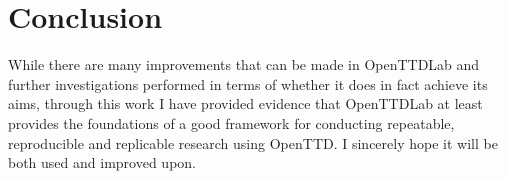 \documentclass[logo,msc,dsti]{style/infthesis}    %
\begin{document}
{\chapter{Conclusion}
\label{chapter:conclusion}

While there are many improvements that can be made in OpenTTDLab and further investigations performed in terms of whether it does in fact achieve its aims, through this work I have provided evidence that OpenTTDLab at least provides the foundations of a good framework for conducting repeatable, reproducible and replicable research using OpenTTD. I sincerely hope it will be both used and improved upon.











}
\end{document}
